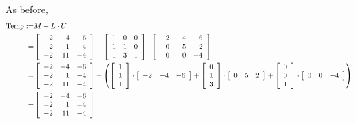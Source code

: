 \begin{tcolorbox}[title=\textbf{\Large Let's remind ourselves why this works:}]
 As before,
\begin{align*}
    {\rm Temp} :=& M - L \cdot U \\
    =& \left[ \begin{array}{rrr} -2 & -4 & -6 \\ -2 & 1 & -4 \\ -2 & 11 & -4 \end{array} \right] 
    - \left[ \begin{array}{rrr} 1 & 0 & 0 \\ 1 & 1 & 0 \\ 1 & 3 & 1 \end{array} \right] \cdot \left[ \begin{array}{rrr} -2 & -4 & -6 \\ 0 & 5 & 2 \\ 0 & 0 & -4 \end{array} \right] \\
    =& \left[ \begin{array}{rrr} -2 & -4 & -6 \\ -2 & 1 & -4 \\ -2 & 11 & -4 \end{array} \right]
    - \left( \left[ \begin{array}{r} 1 \\ 1 \\ 1 \end{array} \right] \cdot \left[ \begin{array}{rrr} -2 & -4 & -6 \end{array} \right] + \left[ \begin{array}{r} 0 \\ 1 \\ 3 \end{array} \right] \cdot \left[ \begin{array}{rrr} 0 & 5 & 2 \end{array} \right] + \left[ \begin{array}{r} 0 \\ 0 \\ 1 \end{array} \right] \cdot \left[ \begin{array}{rrr} 0 & 0 & -4 \end{array} \right] \right) \\
    =& \left[ \begin{array}{rrr} -2 & -4 & -6 \\ -2 & 1 & -4 \\ -2 & 11 & -4 \end{array} \right] 

\end{align*}
\end{tcolorbox}
